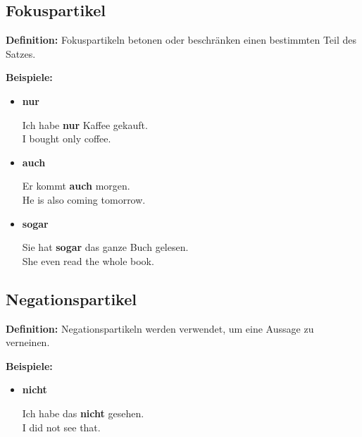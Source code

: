 \documentclass{article}
\begin{document}
        \subsection{Fokuspartikel}
            
            \textbf{Definition:} Fokuspartikeln betonen oder beschränken einen bestimmten Teil des Satzes.
            
            \textbf{Beispiele:}
            
            \begin{itemize}
                
                \item \textbf{nur}
                
                Ich habe \textbf{nur} Kaffee gekauft.\\
                I bought only coffee.
                
                \item \textbf{auch}
                
                Er kommt \textbf{auch} morgen.\\
                He is also coming tomorrow.
                
                \item \textbf{sogar}
                
                Sie hat \textbf{sogar} das ganze Buch gelesen.\\
                She even read the whole book.
            
            \end{itemize}
        
        \subsection{Negationspartikel}
            
            \textbf{Definition:} Negationspartikeln werden verwendet, um eine Aussage zu verneinen.
            
            \textbf{Beispiele:}
            
            \begin{itemize}
                
                \item \textbf{nicht}
                
                Ich habe das \textbf{nicht} gesehen.\\
                I did not see that.
            
            \end{itemize}
        
\end{document}
